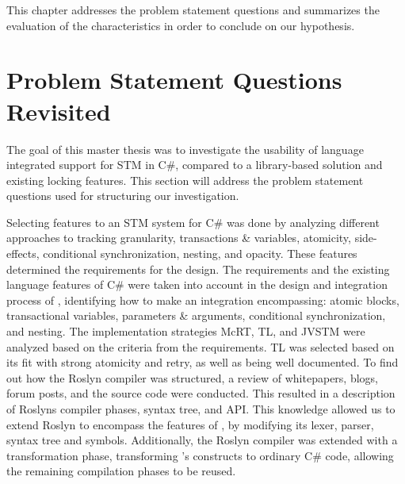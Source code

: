 



This chapter addresses the problem statement questions and summarizes the evaluation of the characteristics in order to conclude on our hypothesis. %

\label{chap:conclusion}

\section{Problem Statement Questions Revisited}
The goal of this master thesis was to investigate the usability of language integrated support for \ac{STM} in C\#, compared to a library-based solution and existing locking features. This section will address the problem statement questions used for structuring our investigation.

Selecting features to an \ac{STM} system for C\# was done by analyzing different approaches to tracking granularity, transactions \& variables, atomicity, side-effects, conditional synchronization, nesting, and opacity. These features determined the requirements for the design. The requirements and the existing language features of C\# were taken into account in the design and integration process of \stmname, identifying how to make an integration encompassing: atomic blocks, transactional variables, parameters \& arguments, conditional synchronization, and nesting. The implementation strategies McRT, TL, and JVSTM were analyzed based on the criteria from the requirements. TL was selected based on its fit with strong atomicity and retry, as well as being well documented. To find out how the Roslyn compiler was structured, a review of whitepapers, blogs, forum posts, and the source code were conducted. This resulted in a description of Roslyns compiler phases, syntax tree, and \ac{API}. This knowledge allowed us to extend Roslyn to encompass the features of \stmname, by modifying its lexer, parser, syntax tree and symbols. Additionally, the Roslyn compiler was extended with a transformation phase, transforming \stmname's constructs to ordinary C\# code, allowing the remaining compilation phases to be reused.

